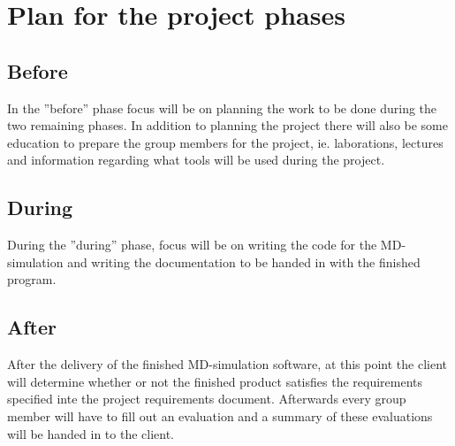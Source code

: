 \section{Plan for the project phases}

\subsection{Before}
In the ''before'' phase focus will be on planning the work to be done during
the two remaining phases. In addition to planning the project there will also
be some education to prepare the group members for the project, ie.
laborations, lectures and information regarding what tools will be used during
the project.

\subsection{During}
During the ''during'' phase, focus will be on writing the code for the
MD-simulation and writing the documentation to be handed in with the finished
program.

\subsection{After}
After the delivery of the finished MD-simulation software, at this point the
client will determine whether or not the finished product satisfies the
requirements specified inte the project requirements document. Afterwards
every group member will have to fill out an evaluation and a summary of these
evaluations will be handed in to the client.
